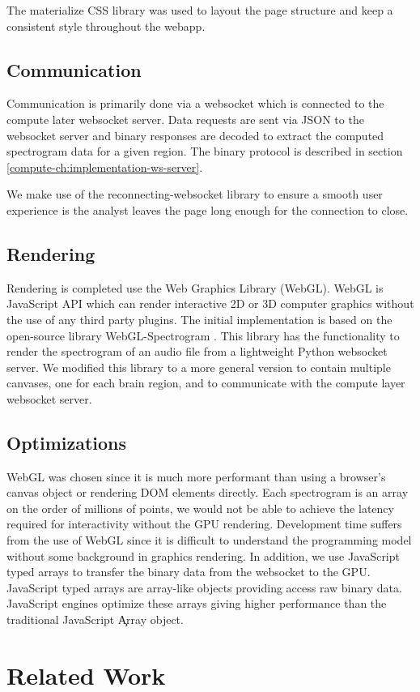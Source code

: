 The materialize CSS library \cite{materialize} was used to layout the page
structure and keep a consistent style throughout the webapp.

\subsection{Communication}

Communication is primarily done via a websocket which is connected to the
compute later websocket server. Data requests are sent via JSON to the
websocket server and binary responses are decoded to extract the computed
spectrogram data for a given region. The binary protocol is described in
section \ref{compute-ch:implementation-ws-server}.

We make use of the reconnecting-websocket \cite{reconnecting-websocket} library
to ensure a smooth user experience is the analyst leaves the page long enough
for the connection to close.

\subsection{Rendering}

Rendering is completed use the Web Graphics Library (WebGL). WebGL is
JavaScript API which can render interactive 2D or 3D computer graphics without
the use of any third party plugins. The initial implementation is based on the
open-source library WebGL-Spectrogram \cite{webgl-spectrogram}. This library
has the functionality to render the spectrogram of an audio file from a
lightweight Python websocket server. We modified this library to a more general
version to contain multiple canvases, one for each brain region, and to
communicate with the compute layer websocket server. \\

\subsection{Optimizations}

WebGL was chosen since it is much more performant than using a browser's canvas
object or rendering DOM elements directly. Each spectrogram is an array on the
order of millions of points, we would not be able to achieve the latency
required for interactivity without the GPU rendering. Development time suffers
from the use of WebGL since it is difficult to understand the programming model
without some background in graphics rendering. In addition, we use JavaScript
typed arrays to transfer the binary data from the websocket to the GPU.
JavaScript typed arrays are array-like objects providing access raw binary
data. JavaScript engines optimize these arrays giving higher performance than
the traditional JavaScript \c{Array} object.

\section{Related Work}

